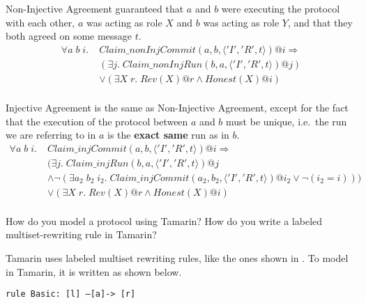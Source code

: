 \begin{questions}
\begin{solution}
    Non-Injective Agreement guaranteed that $a$ and $b$ were executing the protocol with each other, $a$ was acting as role $X$ and $b$ was acting as role $Y$, and that they both agreed on some message $t$.
    \begin{equation}\label{eq:NonInjective_Agreement}
      \begin{aligned}
        \forall a\; b\; i.\; &Claim\_nonInjCommit(a, b, \langle 'I', 'R', t \rangle)@i \Rightarrow \\
        &(\exists j.\; Claim\_nonInjRun(b, a, \langle 'I', 'R', t \rangle)@j) \\
        &\vee (\exists X\; r.\; Rev(X)@r \wedge Honest(X)@i) \\
      \end{aligned}
    \end{equation}

    Injective Agreement is the same as Non-Injective Agreement, except for the fact that the execution of the protocol between $a$ and $b$ must be unique, i.e.\ the run we are referring to in $a$ is the \textbf{exact same} run as in $b$.
    \begin{equation}\label{eq:Injective_Agreement}
      \begin{aligned}
        \forall a\; b\; i.\; &Claim\_injCommit(a, b, \langle 'I', 'R', t  \rangle)@i \Rightarrow \\
        &(\exists j.\; Claim\_injRun(b, a, \langle 'I', 'R', t \rangle)@j \\
        &\wedge \neg(\exists a_{2}\; b_{2}\; i_{2}.\; Claim\_injCommit(a_{2}, b_{2}, \langle 'I', 'R', t \rangle)@i_{2} \vee \neg(i_{2} = i))) \\
        &\vee (\exists X\; r.\; Rev(X)@r \wedge Honest(X)@i) \\
      \end{aligned}
    \end{equation}
  \end{solution}

\question{} How do you model a protocol using Tamarin? How do you write a labeled multiset-rewriting rule in Tamarin?
  \begin{solution}
    Tamarin uses labeled multiset rewriting rules, like the ones shown in .
    To model  in Tamarin, it is written as shown below.
    \begin{center}
      \texttt{rule Basic: [l] --[a]-> [r]}
    \end{center}
  \end{solution}


\end{questions}
